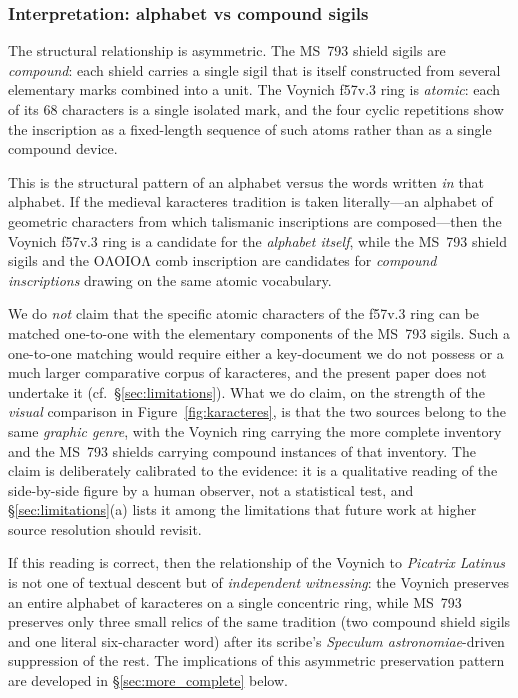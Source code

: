 \subsubsection*{Interpretation: alphabet vs compound sigils}

The structural relationship is asymmetric. The MS~793 shield sigils are
\emph{compound}: each shield carries a single sigil that is itself
constructed from several elementary marks combined into a unit. The
Voynich f57v.3 ring is \emph{atomic}: each of its 68 characters is a
single isolated mark, and the four cyclic repetitions show the
inscription as a fixed-length sequence of such atoms rather than as a
single compound device.

This is the structural pattern of an alphabet versus the words written
\emph{in} that alphabet. If the medieval karacteres tradition is taken
literally---an alphabet of geometric characters from which talismanic
inscriptions are composed---then the Voynich f57v.3 ring is a candidate
for the \emph{alphabet itself}, while the MS~793 shield sigils and the
$\mathrm{O\Lambda OIO\Lambda}$ comb inscription are candidates for
\emph{compound inscriptions} drawing on the same atomic vocabulary.

We do \emph{not} claim that the specific atomic characters of the f57v.3
ring can be matched one-to-one with the elementary components of the
MS~793 sigils. Such a one-to-one matching would require either a
key-document we do not possess or a much larger comparative corpus of
karacteres, and the present paper does not undertake it (cf.\
\S\ref{sec:limitations}). What we do claim, on the strength of the
\emph{visual} comparison in Figure~\ref{fig:karacteres}, is that the
two sources belong to the same \emph{graphic genre}, with the Voynich
ring carrying the more complete inventory and the MS~793 shields
carrying compound instances of that inventory. The claim is deliberately
calibrated to the evidence: it is a qualitative reading of the side-by-side
figure by a human observer, not a statistical test, and
\S\ref{sec:limitations}(a) lists it among the limitations that future
work at higher source resolution should revisit.

If this reading is correct, then the relationship of the Voynich to
\textit{Picatrix Latinus} is not one of textual descent but of
\emph{independent witnessing}: the Voynich preserves an entire alphabet
of karacteres on a single concentric ring, while MS~793 preserves only
three small relics of the same tradition (two compound shield sigils and
one literal six-character word) after its scribe's
\textit{Speculum astronomiae}-driven suppression of the rest. The
implications of this asymmetric preservation pattern are developed in
\S\ref{sec:more_complete} below.


